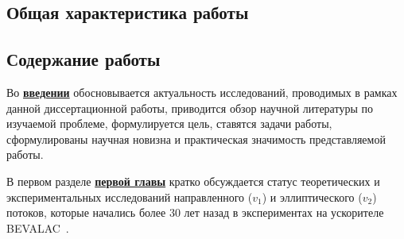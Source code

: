 \subsection*{Общая характеристика работы}

\newcommand{\actuality}{\underline{\textbf{Актуальность темы.}}}
\newcommand{\aim}{\underline{\textbf{Целью}}}
\newcommand{\tasks}{\underline{\textbf{задачи}}}
\newcommand{\defpositions}{\underline{\textbf{Основные положения, выносимые на~защиту:}}}
\newcommand{\novelty}{\underline{\textbf{Научная новизна:}}}
\newcommand{\influence}{\underline{\textbf{Практическая значимость}}}
\newcommand{\reliability}{\underline{\textbf{Достоверность}}}
\newcommand{\probation}{\underline{\textbf{Апробация работы.}}}
\newcommand{\contribution}{\underline{\textbf{Личный вклад.}}}
\newcommand{\publications}{\underline{\textbf{Публикации.}}}




\subsection*{Содержание работы}
Во \underline{\textbf{введении}} обосновывается актуальность исследований, проводимых в рамках данной диссертационной работы, приводится обзор научной литературы по изучаемой проблеме, формулируется цель, ставятся задачи работы, сформулированы научная новизна и практическая значимость представляемой работы.

В первом разделе \underline{\textbf{первой главы}} кратко обсуждается статус теоретических и экспериментальных исследований направленного ($v_1$) и эллиптического ($v_2$) потоков, которые начались более 30 лет назад в экспериментах на ускорителе BEVALAC~\cite{Voloshin:2008dg}.

